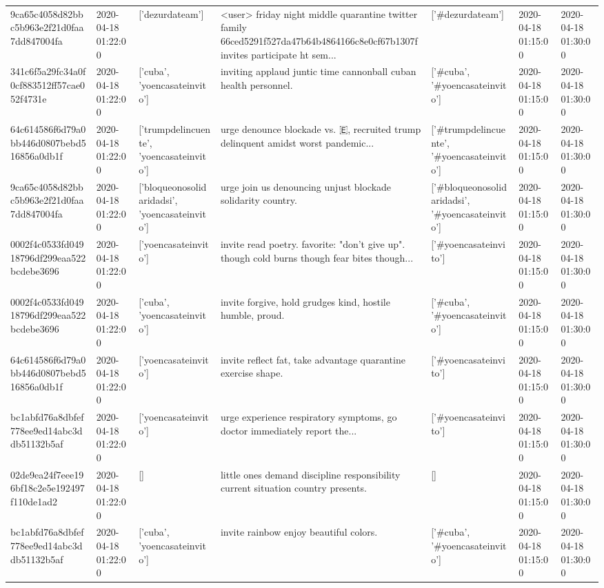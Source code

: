 \begin{tabular}{lllllll}
9ca65c4058d82bbc5b963e2f21d0faa7dd847004fa & 2020-04-18 01:22:00 & ['dezurdateam'] & <user> friday night middle quarantine twitter family 66ced5291f527da47b64b4864166c8e0cf67b1307f invites participate ht sem... & ['#dezurdateam'] & 2020-04-18 01:15:00 & 2020-04-18 01:30:00 \\
341c6f5a29fc34a0f0cf883512ff57cae052f4731e & 2020-04-18 01:22:00 & ['cuba', 'yoencasateinvito'] & inviting applaud juntic time cannonball cuban health personnel. & ['#cuba', '#yoencasateinvito'] & 2020-04-18 01:15:00 & 2020-04-18 01:30:00 \\
64c614586f6d79a0bb446d0807bebd516856a0db1f & 2020-04-18 01:22:00 & ['trumpdelincuente', 'yoencasateinvito'] & urge denounce blockade vs. 🇪, recruited trump delinquent amidst worst pandemic... & ['#trumpdelincuente', '#yoencasateinvito'] & 2020-04-18 01:15:00 & 2020-04-18 01:30:00 \\
9ca65c4058d82bbc5b963e2f21d0faa7dd847004fa & 2020-04-18 01:22:00 & ['bloqueonosolidaridadsi', 'yoencasateinvito'] & urge join us denouncing unjust blockade solidarity country. & ['#bloqueonosolidaridadsi', '#yoencasateinvito'] & 2020-04-18 01:15:00 & 2020-04-18 01:30:00 \\
0002f4c0533fd04918796df299eaa522bcdebe3696 & 2020-04-18 01:22:00 & ['yoencasateinvito'] & invite read poetry. favorite: "don't give up". though cold burns though fear bites though... & ['#yoencasateinvito'] & 2020-04-18 01:15:00 & 2020-04-18 01:30:00 \\
0002f4c0533fd04918796df299eaa522bcdebe3696 & 2020-04-18 01:22:00 & ['cuba', 'yoencasateinvito'] & invite forgive, hold grudges kind, hostile humble, proud. & ['#cuba', '#yoencasateinvito'] & 2020-04-18 01:15:00 & 2020-04-18 01:30:00 \\
64c614586f6d79a0bb446d0807bebd516856a0db1f & 2020-04-18 01:22:00 & ['yoencasateinvito'] & invite reflect fat, take advantage quarantine exercise shape. & ['#yoencasateinvito'] & 2020-04-18 01:15:00 & 2020-04-18 01:30:00 \\
bc1abfd76a8dbfef778ee9ed14abc3ddb51132b5af & 2020-04-18 01:22:00 & ['yoencasateinvito'] & urge experience respiratory symptoms, go doctor immediately report the... & ['#yoencasateinvito'] & 2020-04-18 01:15:00 & 2020-04-18 01:30:00 \\
02de9ea24f7eee196bf18c2e5e192497f110de1ad2 & 2020-04-18 01:22:00 & [] & little ones demand discipline responsibility current situation country presents. & [] & 2020-04-18 01:15:00 & 2020-04-18 01:30:00 \\
bc1abfd76a8dbfef778ee9ed14abc3ddb51132b5af & 2020-04-18 01:22:00 & ['cuba', 'yoencasateinvito'] & invite rainbow enjoy beautiful colors. & ['#cuba', '#yoencasateinvito'] & 2020-04-18 01:15:00 & 2020-04-18 01:30:00 \\

\end{tabular}
